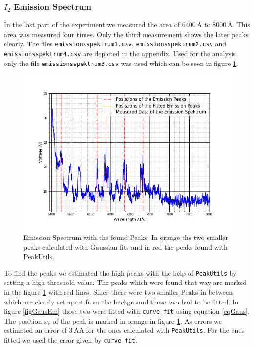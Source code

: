 \subsubsection{$I_2$ Emission Spectrum}
In the last part of the experiment we measured the area of $6400\,\text{\AA}$ to $8000\,\text{\AA}$. This area was measured four times. Only the third measurement shows the later peaks clearly. The files \verb|emissionsspektrum1.csv|, \verb|emissionsspektrum2.csv| and \verb|emissionsspektrum4.csv| are depicted in the appendix. Used for the analysis only the file \verb|emissionsspektrum3.csv| was used which can be seen in figure \ref{figEMISSION}.
\begin{figure}[ht]
	\includegraphics[scale=0.5]{Bild/E3_1.png}
	\centering
	\caption[Emission Spectrum with the found Peaks]{\small Emission Spectrum with the found Peaks. In orange the two smaller peaks calculated with Gaussian fits and in red the peaks found with PeakUtils.}
	\label{figEMISSION}
\end{figure}
To find the peaks we estimated the high peaks with the help of \verb|PeakUtils|\cite{Peak} by setting a high threshold value. The peaks which were found that way are marked in the figure \ref{figEMISSION} with red lines. Since there were two smaller Peaks in between which are clearly set apart from the background those two had to be fitted. In figure \ref{figGausEm}  those two were fitted with \verb|curve_fit| using equation \ref{eqGaus}. The position $x_c$ of the peak is marked in orange in figure \ref{figEMISSION}. As errors we estimated an error of $3\,\text{AA}$ for the ones calculated with \verb|PeakUtils|. For the ones fitted we used the error given by \verb|curve_fit|.\par
